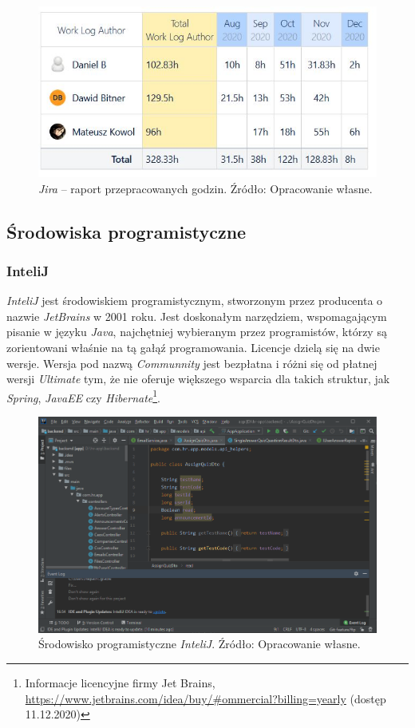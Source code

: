 \documentclass[twoside]{projektInzynierskiMS}
\numberwithin{figure}{section}
\begin{document}
\begin{figure}[h!]
  \centering
  \includegraphics[scale=0.9]{images/jira8.JPG}
    \caption{\textit{Jira} -- raport przepracowanych godzin. Źródło: Opracowanie własne.}
    \label{fig:jira_raport_user}
\end{figure}

\newpage
\subsection{Środowiska programistyczne}
\subsubsection{InteliJ}
\textit{InteliJ} jest środowiskiem programistycznym, stworzonym przez producenta o nazwie \textit{JetBrains} w 2001 roku. Jest doskonałym narzędziem, wspomagającym pisanie w języku \textit{Java}, najchętniej wybieranym przez programistów, którzy są zorientowani właśnie na tą gałąź programowania. Licencje dzielą się na dwie wersje. Wersja pod nazwą \textit{Communnity} jest bezpłatna i różni się od płatnej wersji \textit{Ultimate} tym, że nie oferuje większego wsparcia dla takich struktur, jak \textit{Spring}, \textit{JavaEE} czy \textit{Hibernate}\footnote{Informacje licencyjne firmy Jet Brains, \newline 
\url{https://www.jetbrains.com/idea/buy/\#ommercial?billing=yearly} (dostęp 11.12.2020)}.

\begin{figure}[h!]
  \centering
  \includegraphics[scale=0.55]{images/intelij.png}
    \caption{Środowisko programistyczne \textit{InteliJ}. Źródło: Opracowanie własne.}
    \label{fig:androidstudio}
\end{figure}
\end{document}
